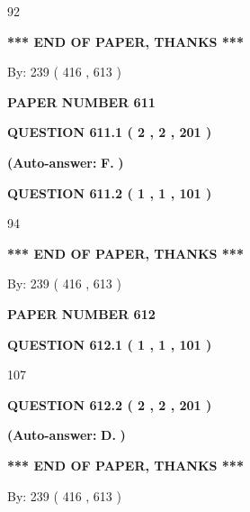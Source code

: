 \documentclass{ctexart}
\begin{document}
92
   
   
   
   
\vspace{1.0in} 
{\textbf{\large{ *** END OF PAPER, THANKS *** }}} 
   
   
\hspace{1.0in} By: 
 239 ( 416 ,  613 )
   
   
   
   
\newpage 
\setcounter{page}{ 
   611001 } 
   
   
 {\textbf{ \Large{ PAPER NUMBER  611  }}}
   
   
   
   
  
  
{\textbf{\large{QUESTION
611.1 
 ( 2 , 2 , 201 )
}}}
 
 
{\textbf{(Auto-answer:}}
{\textbf{\large{
F.}}}
{\textbf{)}}
 
 
  
  
{\textbf{\large{QUESTION
611.2 
 ( 1 , 1 , 101 )
}}}

94
   
   
   
   
\vspace{1.0in} 
{\textbf{\large{ *** END OF PAPER, THANKS *** }}} 
   
   
\hspace{1.0in} By: 
 239 ( 416 ,  613 )
   
   
   
   
\newpage 
\setcounter{page}{ 
   612001 } 
   
   
 {\textbf{ \Large{ PAPER NUMBER  612  }}}
   
   
   
   
  
  
{\textbf{\large{QUESTION
612.1 
 ( 1 , 1 , 101 )
}}}

107
  
  
{\textbf{\large{QUESTION
612.2 
 ( 2 , 2 , 201 )
}}}
 
 
{\textbf{(Auto-answer:}}
{\textbf{\large{
D.}}}
{\textbf{)}}
 
 
   
   
   
   
\vspace{1.0in} 
{\textbf{\large{ *** END OF PAPER, THANKS *** }}} 
   
   
\hspace{1.0in} By: 
 239 ( 416 ,  613 )
   
   
   
   
\newpage 
\setcounter{page}{ 
   613001 } 
   
\end{document}

